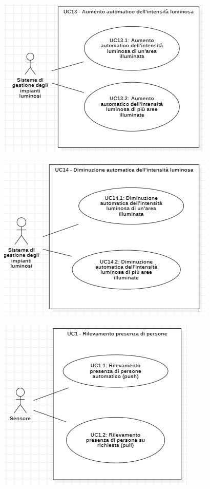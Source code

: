 \documentclass[a4paper, 12pt]{article}
\begin{document}
\includegraphics[scale=0.7]{diagramma_use_case_8.png}

\includegraphics[scale=0.7]{diagramma_use_case_9.png}

\includegraphics[scale=0.60]{diagramma_use_case_10.png}
\end{document}
